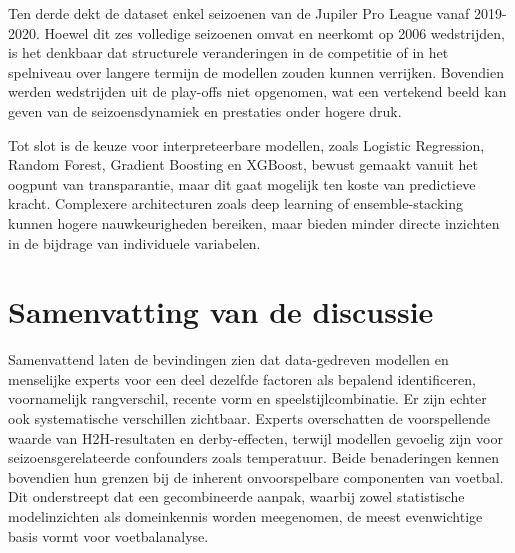 \vspace{5pt}

Ten derde dekt de dataset enkel seizoenen van de Jupiler Pro League vanaf 2019-2020.
Hoewel dit zes volledige seizoenen omvat en neerkomt op 2006 wedstrijden, is het denkbaar
dat structurele veranderingen in de competitie of in het spelniveau over langere termijn
de modellen zouden kunnen verrijken.
Bovendien werden wedstrijden uit de play-offs niet opgenomen, wat een vertekend beeld kan geven van de seizoensdynamiek en prestaties onder hogere druk.

\vspace{5pt}

Tot slot is de keuze voor interpreteerbare modellen, zoals Logistic Regression, Random Forest, Gradient Boosting en XGBoost,
bewust gemaakt vanuit het oogpunt van transparantie, maar dit gaat mogelijk ten koste van predictieve kracht.
Complexere architecturen zoals deep learning of ensemble-stacking kunnen hogere nauwkeurigheden bereiken,
maar bieden minder directe inzichten in de bijdrage van individuele variabelen.

\section{Samenvatting van de discussie}

Samenvattend laten de bevindingen zien dat data-gedreven modellen en menselijke experts voor een deel dezelfde factoren
als bepalend identificeren, voornamelijk rangverschil, recente vorm en speelstijlcombinatie.
Er zijn echter ook systematische verschillen zichtbaar.
Experts overschatten de voorspellende waarde van H2H-resultaten en derby-effecten,
terwijl modellen gevoelig zijn voor seizoensgerelateerde confounders zoals temperatuur.
Beide benaderingen kennen bovendien hun grenzen bij de inherent onvoorspelbare componenten van voetbal.
Dit onderstreept dat een gecombineerde aanpak, waarbij zowel statistische modelinzichten als domeinkennis worden meegenomen,
de meest evenwichtige basis vormt voor voetbalanalyse.